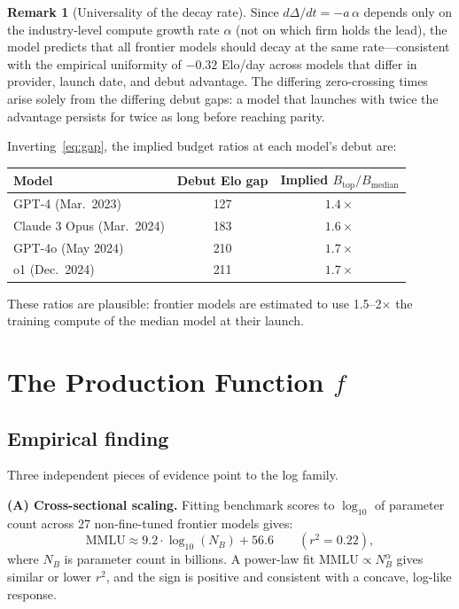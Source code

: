 \documentclass{article}
\theoremstyle{definition}
\newtheorem{remark}{Remark}
\begin{document}
\begin{remark}[Universality of the decay rate]
Since $d\Delta/dt = -a\,\alpha$ depends only on the industry-level compute growth
rate $\alpha$ (not on which firm holds the lead), the model predicts that all
frontier models should decay at the same rate---consistent with the empirical
uniformity of $-0.32$ Elo/day across models that differ in provider, launch
date, and debut advantage.  The differing zero-crossing times arise solely from
the differing debut gaps: a model that launches with twice the advantage persists
for twice as long before reaching parity.
\end{remark}

\noindent Inverting~\eqref{eq:gap}, the implied budget ratios at each model's
debut are:

\begin{center}
\begin{tabular}{lcc}
\toprule
Model & Debut Elo gap & Implied $B_\mathrm{top}/B_\mathrm{median}$ \\
\midrule
GPT-4 (Mar.\ 2023) & 127 & $1.4\times$ \\
Claude 3 Opus (Mar.\ 2024) & 183 & $1.6\times$ \\
GPT-4o (May 2024) & 210 & $1.7\times$ \\
o1 (Dec.\ 2024)   & 211 & $1.7\times$ \\
\bottomrule
\end{tabular}
\end{center}

\noindent These ratios are plausible: frontier models are estimated to use
1.5--2$\times$ the training compute of the median model at their launch.


\section{The Production Function $f$}

\subsection*{Empirical finding}

Three independent pieces of evidence point to the log family.

\medskip\noindent\textbf{(A) Cross-sectional scaling.}
Fitting benchmark scores to $\log_{10}$ of parameter count across 27 non-fine-tuned
frontier models gives:
\[
  \text{MMLU} \approx 9.2 \cdot \log_{10}(N_B) + 56.6 \qquad (r^2 = 0.22),
\]
where $N_B$ is parameter count in billions.  A power-law fit $\text{MMLU}
\propto N_B^\alpha$ gives similar or lower $r^2$, and the sign is positive and
consistent with a concave, log-like response.
\end{document}
